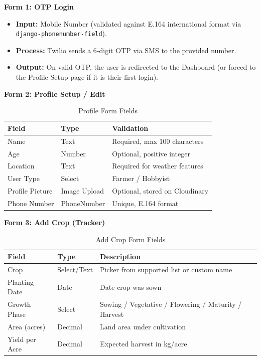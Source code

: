 \documentclass[12pt,a4paper]{article}
\begin{document}
\textbf{Form 1: OTP Login}

\begin{itemize}
    \item \textbf{Input:} Mobile Number (validated against E.164 international format via \texttt{django-phonenumber-field}).
    \item \textbf{Process:} Twilio sends a 6-digit OTP via SMS to the provided number.
    \item \textbf{Output:} On valid OTP, the user is redirected to the Dashboard (or forced to the Profile Setup page if it is their first login).
\end{itemize}

\textbf{Form 2: Profile Setup / Edit}

\begin{table}[h]
\caption{Profile Form Fields}
\centering
\begin{tabular}{|l|l|p{6cm}|}
\hline
\textbf{Field} & \textbf{Type} & \textbf{Validation} \\ \hline
Name & Text & Required, max 100 characters \\ \hline
Age & Number & Optional, positive integer \\ \hline
Location & Text & Required for weather features \\ \hline
User Type & Select & Farmer / Hobbyist \\ \hline
Profile Picture & Image Upload & Optional, stored on Cloudinary \\ \hline
Phone Number & PhoneNumber & Unique, E.164 format \\ \hline
\end{tabular}
\end{table}

\textbf{Form 3: Add Crop (Tracker)}

\begin{table}[h]
\caption{Add Crop Form Fields}
\centering
\begin{tabular}{|l|l|p{6cm}|}
\hline
\textbf{Field} & \textbf{Type} & \textbf{Description} \\ \hline
Crop & Select/Text & Picker from supported list or custom name \\ \hline
Planting Date & Date & Date crop was sown \\ \hline
Growth Phase & Select & Sowing / Vegetative / Flowering / Maturity / Harvest \\ \hline
Area (acres) & Decimal & Land area under cultivation \\ \hline
Yield per Acre & Decimal & Expected harvest in kg/acre \\ \hline
\end{tabular}
\end{table}
\end{document}
